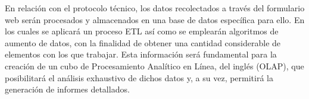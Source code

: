 En relación con el protocolo técnico, los datos recolectados a través del formulario web serán procesados y almacenados en una base de datos específica para ello.
En los cuales se aplicará un proceso ETL así como se emplearán algoritmos de aumento de datos, con la finalidad de obtener una cantidad considerable
de elementos con los que trabajar. Esta información será fundamental para la creación de un
cubo de Procesamiento Analítico en Línea, del inglés (OLAP), que posibilitará el análisis
exhaustivo de dichos datos y, a su vez, permitirá la generación de informes detallados.

